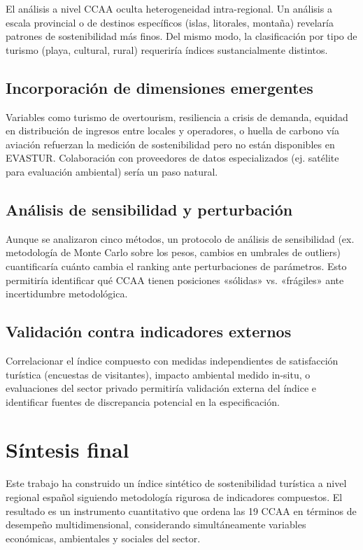 {El análisis a nivel CCAA oculta heterogeneidad intra-regional. Un análisis a escala provincial o de destinos específicos (islas, litorales, montaña) revelaría patrones de sostenibilidad más finos. Del mismo modo, la clasificación por tipo de turismo (playa, cultural, rural) requeriría índices sustancialmente distintos.

\subsection{Incorporación de dimensiones emergentes}

Variables como turismo de overtourism, resiliencia a crisis de demanda, equidad en distribución de ingresos entre locales y operadores, o huella de carbono vía aviación refuerzan la medición de sostenibilidad pero no están disponibles en EVASTUR. Colaboración con proveedores de datos especializados (ej. satélite para evaluación ambiental) sería un paso natural.

\subsection{Análisis de sensibilidad y perturbación}

Aunque se analizaron cinco métodos, un protocolo de análisis de sensibilidad (ex. metodología de Monte Carlo sobre los pesos, cambios en umbrales de outliers) cuantificaría cuánto cambia el ranking ante perturbaciones de parámetros. Esto permitiría identificar qué CCAA tienen posiciones «sólidas» vs. «frágiles» ante incertidumbre metodológica.

\subsection{Validación contra indicadores externos}

Correlacionar el índice compuesto con medidas independientes de satisfacción turística (encuestas de visitantes), impacto ambiental medido in-situ, o evaluaciones del sector privado permitiría validación externa del índice e identificar fuentes de discrepancia potencial en la especificación.

\section{Síntesis final}

Este trabajo ha construido un índice sintético de sostenibilidad turística a nivel regional español siguiendo metodología rigurosa de indicadores compuestos. El resultado es un instrumento cuantitativo que ordena las 19 CCAA en términos de desempeño multidimensional, considerando simultáneamente variables económicas, ambientales y sociales del sector.

}
